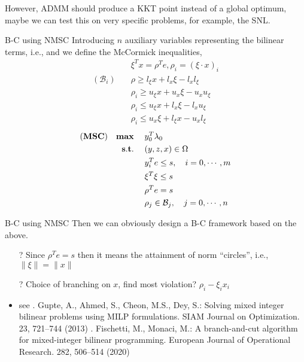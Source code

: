 \begin{frame}
  However, ADMM should produce a KKT point instead of a global optimum, maybe we can test this on very specific problems,
  for example, the SNL.
\end{frame}
\begin{frame}{B-C using NMSC}
  Introducing \(n\) auxiliary variables representing the bilinear terms, i.e., and we define the McCormick inequalities,
  \begin{align}
                         & \xi^Tx = \rho^Te, \rho_i = (\xi \cdot x)_i \\
    (\mathcal B_i) \quad & \rho \geq l_\xi x+l_x \xi - l_x l_\xi      \\
                         & \rho_i \geq u_\xi x+u_x \xi-u_{x} u_\xi    \\
                         & \rho_i \leq u_\xi x+l_x \xi-l_x u_\xi      \\
                         & \rho_i \leq u_x\xi +l_\xi x-u_x l_\xi
  \end{align}
  \begin{align}
    (\textbf{MSC}) \quad \mathbf{max}\;\quad & y_0 ^T\lambda_0                               \\
    \mathbf{s.t.}\; \quad                  & (y,z,x) \in \Omega                            \\
                               & y_i^Te \le s, \quad i=0, \cdots, m            \\
                               & \xi^T\xi \le s                                \\
                               & \rho^Te = s                                   \\
                               & \rho_j \in \mathcal B_j, \quad j=0, \cdots, n
  \end{align}
\end{frame}
\begin{frame}{B-C using NMSC}
  Then we can obviously design a B-C framework based on the above.
  \begin{itemize}
    \item[?] Since \(\rho^Te = s\) then it means the attainment of norm ``circles'', i.e., \(\|\xi\| = \|x\|\)
    \item[?] Choice of branching on \(x\), find most violation? \(\rho_i - \xi_i x_i\)
    \item see . Gupte, A., Ahmed, S., Cheon, M.S., Dey, S.: Solving mixed integer bilinear problems using MILP formulations. SIAM Journal on Optimization. 23, 721–744 (2013) . Fischetti, M., Monaci, M.: A branch-and-cut algorithm for mixed-integer bilinear programming. European Journal of Operational Research. 282, 506–514 (2020)

  \end{itemize}
\end{frame}
\begin{frame}
  \scriptsize
  \printbibliography
\end{frame}
